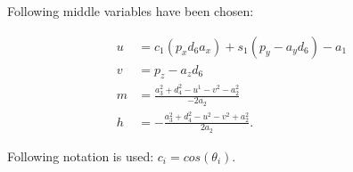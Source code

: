\medskip

Following middle variables have been chosen:

\begin{subequations}
	\begin{align*}
		u&=c_1 (p_x d_6 a_x ) + s_1 (p_y -a_y d_6)-a_1 \\
		v&= p_z - a_z d_6 \\
		m&= \frac{a_3^2 +d_4^2 - u^1 -v^2 - a_2^2}{-2a_2} \\
		h&=-\frac{a_3^2 + d_4^2 - u^2 -v^2 + a_2^2}{2a_2} .
	\end{align*}
\end{subequations}

Following notation is used: $c_i = cos(\theta_i)$.


